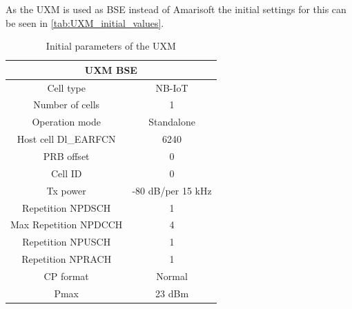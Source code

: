 As the UXM is used as \gls{BSE} instead of Amarisoft the initial settings for this can be seen in \autoref{tab:UXM_initial_values}.

\begin{table}[H]
\centering
\begin{tabular}{|c|c|} \hline
\multicolumn{2}{|c|}{\textbf{UXM \gls{BSE}}} \\ \hline
Cell type			 & NB-IoT         \\ \hline
Number of cells		 & 1              \\ \hline
Operation mode		 & Standalone     \\ \hline
Host cell Dl\_EARFCN & 6240           \\ \hline
PRB offset			 & 0	          \\ \hline
Cell ID				 & 0              \\ \hline
Tx power			 & -80 dB/per 15 kHz \\ \hline
Repetition NPDSCH	 & 1	          \\ \hline
Max Repetition NPDCCH & 4	          \\ \hline
Repetition NPUSCH	 & 1	          \\ \hline
Repetition NPRACH	 & 1	          \\ \hline
CP format			 & Normal         \\ \hline
Pmax				 & 23 dBm         \\ \hline
\end{tabular}
\caption{Initial parameters of the UXM}
\label{tab:UXM_initial_values}
\end{table}

